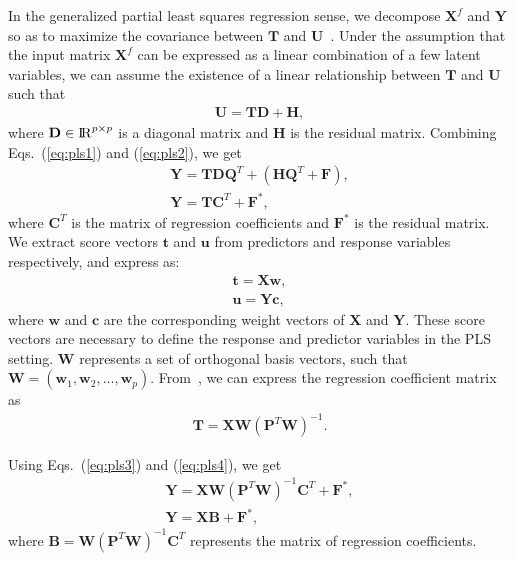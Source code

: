 In the generalized partial least squares regression sense, we decompose $\mathbf{X}^{f}$ and $\mathbf{Y}$ so as to maximize the covariance between $\mathbf{T}$ and $\mathbf{U}$~\cite{SIMPLS}.
Under the assumption that the input matrix $\mathbf{X}^{f}$ can be expressed as a linear combination of a few latent variables, we can assume the existence of a linear relationship between $\mathbf{T}$ and $\mathbf{U}$ such that \begin{align}
\label{eq:pls2}
\mathbf{U} = \mathbf{T}\mathbf{D}+\mathbf{H},
\end{align}
where $\mathbf{D} \in {\rm I\!R}^{p \times p}$ is a diagonal matrix and $\mathbf{H}$ is the residual matrix. Combining Eqs.\ (\ref{eq:pls1}) and (\ref{eq:pls2}), we get
\begin{gather}
\label{eq:pls3}
\mathbf{Y}=\mathbf{T}\mathbf{D}{\mathbf{Q}}^{T} + (\mathbf{H}\mathbf{Q}^{T} + \mathbf{F}),\\
\mathbf{Y}=\mathbf{T}\mathbf{C}^{T} + \mathbf{F}^{*},
\end{gather}
where $\mathbf{C}^{T}$ is the matrix of regression coefficients and $\mathbf{F}^{*}$ is the residual matrix. We extract score vectors $\mathbf{t}$ and $\mathbf{u}$ from predictors and response variables respectively, and express as: 
\begin{gather}
\mathbf{t}=\mathbf{Xw},\\
\mathbf{u}=\mathbf{Yc},
\end{gather}
where $\mathbf{w}$ and $\mathbf{c}$ are the corresponding weight vectors of $\mathbf{X}$ and $\mathbf{Y}$. These score vectors are necessary to define the response and predictor variables in the PLS setting. $\mathbf{W}$ represents a set of orthogonal basis vectors, such that $\mathbf{W}=(\mathbf{w}_1, \mathbf{w}_2, \ldots, \mathbf{w}_p)$. From~\cite{Manne1987}, we can express the regression coefficient matrix as 
\begin{align}
\label{eq:pls4}
\mathbf{T} = \mathbf{X}\mathbf{W}(\mathbf{P}^{T}\mathbf{W})^{-1}.
\end{align}

Using Eqs.~(\ref{eq:pls3}) and (\ref{eq:pls4}), we get
\begin{gather}
\label{eq:pls5}
\mathbf{Y}=\mathbf{X}\mathbf{W}(\mathbf{P}^{T}\mathbf{W})^{-1}\mathbf{C}^{T} + \mathbf{F}^{*}, \\
\label{eq:pls6}
\mathbf{Y}=\mathbf{XB} + \mathbf{F}^{*},
\end{gather}
where $\mathbf{B}=\mathbf{W}(\mathbf{P}^{T}\mathbf{W})^{-1}\mathbf{C}^{T}$ represents the matrix of regression coefficients. 

